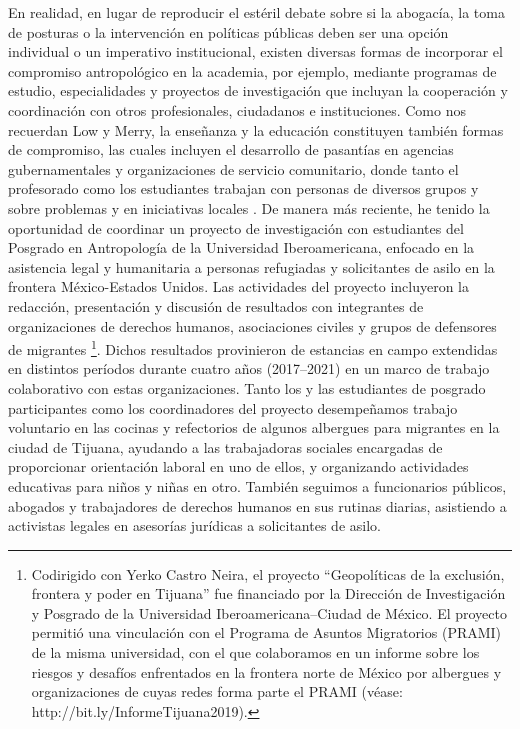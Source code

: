 \documentclass[
  spanish,
  11pt,
  a4paper,
]{scrbook}
\begin{document}
En realidad, en lugar de reproducir el estéril debate sobre si la
abogacía, la toma de posturas o la intervención en políticas públicas
deben ser una opción individual o un imperativo institucional, existen
diversas formas de incorporar el compromiso antropológico en la
academia, por ejemplo, mediante programas de estudio, especialidades y
proyectos de investigación que incluyan la cooperación y coordinación
con otros profesionales, ciudadanos e instituciones. Como nos recuerdan
Low y Merry, la enseñanza y la educación constituyen también formas de
compromiso, las cuales incluyen el desarrollo de pasantías en agencias
gubernamentales y organizaciones de servicio comunitario, donde tanto el
profesorado como los estudiantes trabajan con personas de diversos
grupos y sobre problemas y en iniciativas locales
\autocite[208]{Low2010}. De manera más reciente, he tenido la
oportunidad de coordinar un proyecto de investigación con estudiantes
del Posgrado en Antropología de la Universidad Iberoamericana, enfocado
en la asistencia legal y humanitaria a personas refugiadas y
solicitantes de asilo en la frontera México-Estados Unidos. Las
actividades del proyecto incluyeron la redacción, presentación y
discusión de resultados con integrantes de organizaciones de derechos
humanos, asociaciones civiles y grupos de defensores de migrantes
\footnote{Codirigido con Yerko Castro Neira, el proyecto ``Geopolíticas
  de la exclusión, frontera y poder en Tijuana'' fue financiado por la
  Dirección de Investigación y Posgrado de la Universidad
  Iberoamericana--Ciudad de México. El proyecto permitió una vinculación
  con el Programa de Asuntos Migratorios (PRAMI) de la misma
  universidad, con el que colaboramos en un informe sobre los riesgos y
  desafíos enfrentados en la frontera norte de México por albergues y
  organizaciones de cuyas redes forma parte el PRAMI (véase:
  http://bit.ly/InformeTijuana2019).}. Dichos resultados provinieron de
estancias en campo extendidas en distintos períodos durante cuatro años
(2017--2021) en un marco de trabajo colaborativo con estas
organizaciones. Tanto los y las estudiantes de posgrado participantes
como los coordinadores del proyecto desempeñamos trabajo voluntario en
las cocinas y refectorios de algunos albergues para migrantes en la
ciudad de Tijuana, ayudando a las trabajadoras sociales encargadas de
proporcionar orientación laboral en uno de ellos, y organizando
actividades educativas para niños y niñas en otro. También seguimos a
funcionarios públicos, abogados y trabajadores de derechos humanos en
sus rutinas diarias, asistiendo a activistas legales en asesorías
jurídicas a solicitantes de asilo.
\end{document}
